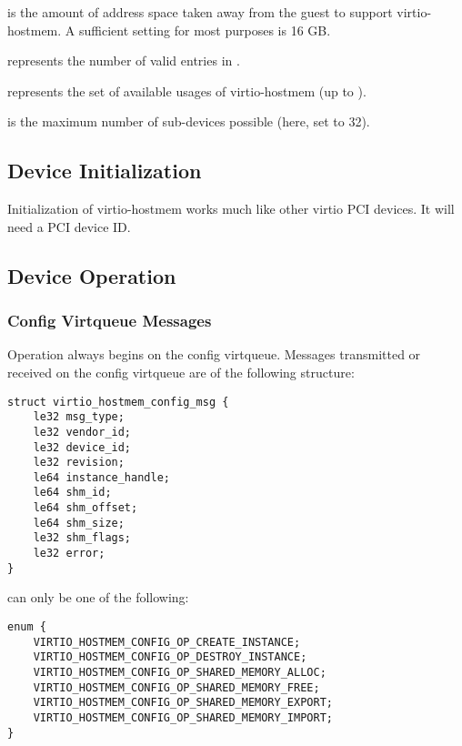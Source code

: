  is the amount of address space taken away from the guest
to support virtio-hostmem.
A sufficient setting for most purposes is 16 GB.

 represents the number of valid entries in .

 represents the set of available usages of virtio-hostmem (up to ).

 is the maximum number of sub-devices possible (here, set to 32).

\subsection{Device Initialization}\label{sec:Device Types / Host Memory Device / Device Initialization}

Initialization of virtio-hostmem works much like other virtio PCI devices.
It will need a PCI device ID.

\subsection{Device Operation}\label{sec:Device Types / Host Memory Device / Device Operation}

\subsubsection{Config Virtqueue Messages}\label{sec:Device Types / Host Memory Device / Device Operation / Config Virtqueue Messages}

Operation always begins on the config virtqueue.
Messages transmitted or received on the config virtqueue are of the following structure:

\begin{lstlisting}
struct virtio_hostmem_config_msg {
    le32 msg_type;
    le32 vendor_id;
    le32 device_id;
    le32 revision;
    le64 instance_handle;
    le64 shm_id;
    le64 shm_offset;
    le64 shm_size;
    le32 shm_flags;
    le32 error;
}
\end{lstlisting}

 can only be one of the following:

\begin{lstlisting}
enum {
    VIRTIO_HOSTMEM_CONFIG_OP_CREATE_INSTANCE;
    VIRTIO_HOSTMEM_CONFIG_OP_DESTROY_INSTANCE;
    VIRTIO_HOSTMEM_CONFIG_OP_SHARED_MEMORY_ALLOC;
    VIRTIO_HOSTMEM_CONFIG_OP_SHARED_MEMORY_FREE;
    VIRTIO_HOSTMEM_CONFIG_OP_SHARED_MEMORY_EXPORT;
    VIRTIO_HOSTMEM_CONFIG_OP_SHARED_MEMORY_IMPORT;
}
\end{lstlisting}

